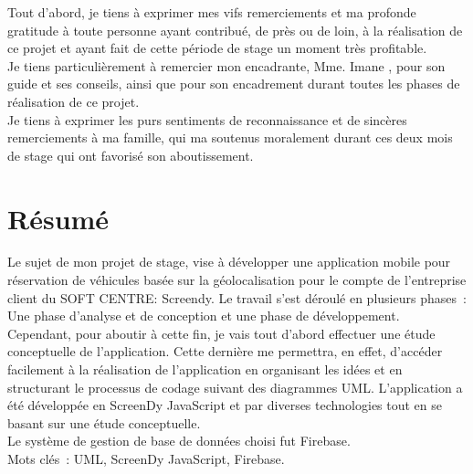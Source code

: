 \documentclass[12pt,a4paper]{report}
\begin{document}
	Tout d'abord, je tiens à exprimer mes vifs remerciements et ma profonde gratitude à toute personne ayant contribué, de près ou de loin, à la réalisation de ce projet et ayant fait de cette période de stage un moment très profitable.\\
	\newline
	Je tiens particulièrement à remercier mon encadrante, Mme. Imane , pour son guide et ses conseils, ainsi que pour son encadrement durant toutes les phases de réalisation de ce projet.\\
	\newline
	Je tiens à exprimer les purs sentiments de reconnaissance et de sincères remerciements à ma famille, qui ma soutenus moralement durant ces deux mois de stage qui ont favorisé son aboutissement.





	\chapter*{Résumé}
	Le sujet de mon projet de stage, vise à développer une application mobile pour réservation de véhicules basée sur la géolocalisation pour le compte de l'entreprise client du SOFT CENTRE: Screendy. Le travail s’est déroulé en plusieurs phases : Une phase d’analyse et de conception et une phase de développement.\\
Cependant, pour aboutir à cette fin, je vais tout d’abord effectuer une étude conceptuelle de l’application. Cette dernière me permettra, en effet, d’accéder facilement à la réalisation de l’application en organisant les idées et en structurant le processus de codage suivant des diagrammes UML. L’application a été développée en \guillemotleft ScreenDy JavaScript \guillemotright et par diverses technologies tout en se basant sur une étude conceptuelle.\\
Le système de gestion de base de données choisi fut Firebase.\\
Mots clés : UML, ScreenDy JavaScript, Firebase.


\end{document}
